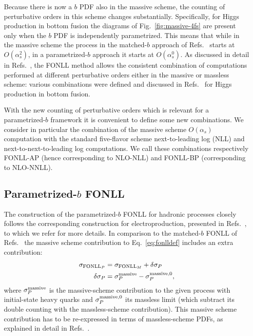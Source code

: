 Because there is now a $b$ PDF also in the massive scheme, the
counting of perturbative orders in this scheme
changes substantially. Specifically, for Higgs production in bottom
fusion the diagrams of Fig.~\ref{fig:massive-4fs} are present only
when the $b$ PDF is independently parametrized. This means that while 
in the
massive scheme the process in the matched-$b$ approach of
Refs.~\cite{Forte:2015hba,Forte:2016sja}  starts at $O(\alpha_s^2)$,
in a parametrized-$b$ approach it starts at 
$O(\alpha_s^0)$. As discussed in detail in
Refs.~\cite{Forte:2010ta,Forte:2015hba,Forte:2016sja},
the FONLL method allows the  consistent combination of computations performed
at different perturbative orders either in the massive or massless
scheme: various combinations were defined and discussed  in
Refs.~\cite{Forte:2015hba,Forte:2016sja} for Higgs production in
bottom fusion.

With the new counting of perturbative orders which is relevant for a
parametrized-$b$ framework it is convenient to define some new
combinations. We  consider in particular the combination of 
the massive scheme $O(\alpha_s)$ computation  with the standard
five-flavor scheme next-to-leading log (NLL) and
next-to-next-to-leading log  computations. We  call these
combinations respectively FONLL-AP (hence corresponding to NLO-NLL)
and FONLL-BP (corresponding to  NLO-NNLL).


\subsection{Parametrized-$b$ FONLL}
\label{sec:parbfonll}

The construction of the parametrized-$b$ FONLL for hadronic processes
closely follows the corresponding construction for electroproduction,
presented in Refs.~\cite{Ball:2015tna,Ball:2015dpa}, to which we refer
for more details. In comparison to the matched-$b$ FONLL of
Refs.~\cite{Forte:2015hba,Forte:2016sja} the massive scheme
contribution to Eq.~\eqref{eq:fonlldef} includes an extra contribution:
\begin{align}
  \label{eq:delta-i}
  \sigma_{\text{FONLL}_P} &= \sigma_{\text{FONLL}_M} +
  \delta\sigma_P\nonumber\\ 
  \quad \quad \delta\sigma_P &= \sigma^{\rm massive}_{P} - \sigma^{{\rm
      massive},0}_{P},
\end{align}
where $\sigma^{\rm massive}_{P}$ is the massive-scheme contribution to
the given process with initial-state heavy quarks and $\sigma^{{\rm
      massive},0}_{P}$ its massless limit (which subtract its double
counting with the massless-scheme contribution). This massive scheme
contribution has to be re-expressed in terms of massless-scheme PDFs,
as explained in detail in
Refs.~\cite{Cacciari:1998it,Forte:2010ta,Ball:2015tna,Ball:2015dpa,Forte:2015hba,Forte:2016sja}.

